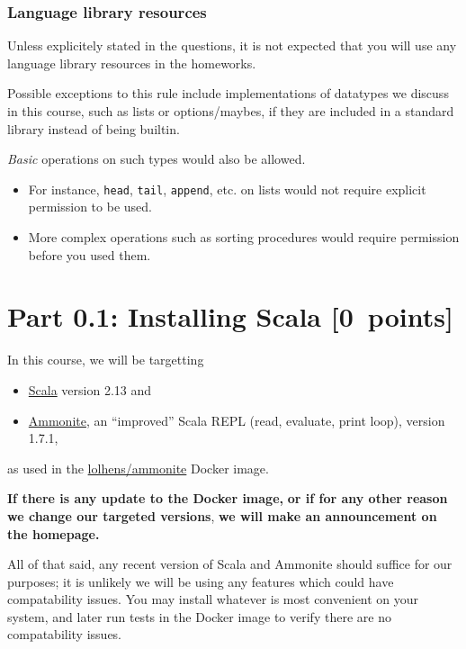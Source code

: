 \documentclass[11pt]{article}
\begin{document}
\subsubsection*{Language library resources}
\label{sec:orgf4f8c93}

Unless explicitely stated in the questions,
it is not expected that you will use any language library resources
in the homeworks.

Possible exceptions to this rule include implementations
of datatypes we discuss in this course, such as lists
or options/maybes, if they are included in a standard library
instead of being builtin.

\emph{Basic} operations on such types would also be allowed.
\begin{itemize}
\item For instance, \texttt{head}, \texttt{tail}, \texttt{append}, etc. on lists
would not require explicit permission to be used.
\item More complex operations such as sorting procedures
would require permission before you used them.
\end{itemize}

\section*{Part 0.1: Installing Scala                  [0 points]}
\label{sec:org5ea0d95}
In this course, we will be targetting
\begin{itemize}
\item \href{https://scala-lang.org}{Scala} version 2.13 and
\item \href{https://ammonite.io}{Ammonite}, an “improved” Scala REPL (read, evaluate, print loop),
version 1.7.1,
\end{itemize}
as used in the
\href{https://hub.docker.com/r/lolhens/ammonite/}{lolhens/ammonite}
Docker image.

\begin{center}
\textbf{If there is any update to the Docker image,}
\textbf{or if for any other reason we change our targeted versions},
\textbf{we will make an announcement on the homepage.}
\end{center}

All of that said, any recent version of Scala and Ammonite
should suffice for our purposes; it is unlikely we will
be using any features which could have compatability issues.
You may install whatever is most convenient on your system,
and later run tests in the Docker image
to verify there are no compatability issues.
\end{document}
